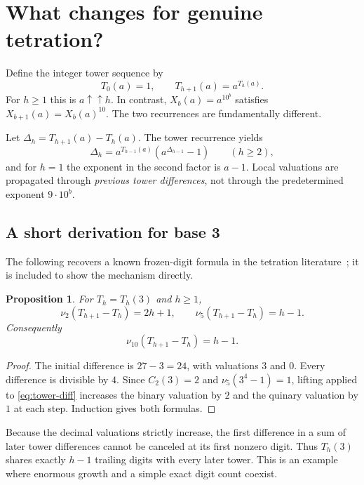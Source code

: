 \documentclass[11pt,a4paper]{article}
\newtheorem{proposition}[theorem]{Proposition}
\theoremstyle{definition}
\begin{document}
\section{What changes for genuine tetration?}\label{sec:tetration}

Define the integer tower sequence by
\[
T_0(a)=1,\qquad T_{h+1}(a)=a^{T_h(a)}.
\]
For $h\ge1$ this is $a\uparrow\uparrow h$. In contrast,
$X_b(a)=a^{10^b}$ satisfies $X_{b+1}(a)=X_b(a)^{10}$.
The two recurrences are fundamentally different.

Let $\Delta_h=T_{h+1}(a)-T_h(a)$. The tower recurrence yields
\begin{equation}\label{eq:tower-diff}
\Delta_h=a^{T_{h-1}(a)}\left(a^{\Delta_{h-1}}-1\right)
\qquad(h\ge2),
\end{equation}
and for $h=1$ the exponent in the second factor is $a-1$.
Local valuations are propagated through \emph{previous tower differences},
not through the predetermined exponent $9\cdot10^b$.

\subsection{A short derivation for base 3}
The following recovers a known frozen-digit formula in the tetration
literature~\cite{graham}; it is included to show the mechanism directly.

\begin{proposition}\label{prop:three}
For $T_h=T_h(3)$ and $h\ge1$,
\[
\nu_2(T_{h+1}-T_h)=2h+1,\qquad
\nu_5(T_{h+1}-T_h)=h-1.
\]
Consequently
\[
\nu_{10}(T_{h+1}-T_h)=h-1.
\]
\end{proposition}
\begin{proof}
The initial difference is $27-3=24$, with valuations $3$ and $0$.
Every difference is divisible by $4$. Since
$C_2(3)=2$ and $\nu_5(3^4-1)=1$, lifting applied to
\eqref{eq:tower-diff} increases the binary valuation by $2$ and the quinary
valuation by $1$ at each step. Induction gives both formulas.
\end{proof}
Because the decimal valuations strictly increase, the first difference in
a sum of later tower differences cannot be canceled at its first nonzero
digit. Thus $T_h(3)$ shares exactly $h-1$ trailing digits with every later
tower. This is an example where enormous growth and a simple exact digit
count coexist.
\end{document}
